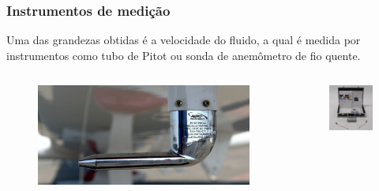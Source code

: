 \begin{frame}
\frametitle{Instrumentos de medição}

Uma das grandezas obtidas é a velocidade do fluido, a qual é medida por instrumentos como tubo de Pitot ou sonda de anemômetro de fio quente.

    \begin{columns}
            \begin{figure}
            \centering
            \includegraphics[scale = 0.6]{figuras/tubodepitotaviao}
            \end{figure}
            \begin{figure}
            \centering
            \includegraphics[scale = 0.6]{figuras/sonda}
            \end{figure}
    \end{columns}
\end{frame}
